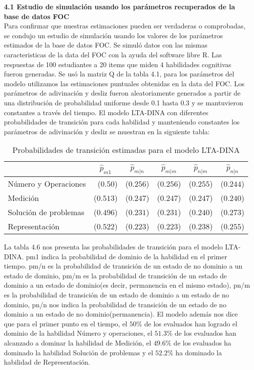 \noindent
\textbf{4.1 Estudio de simulación usando los parámetros recuperados de la base de datos FOC}\\
Para confirmar que nuestras estimaciones pueden ser verdaderas o comprobadas, se condujo un estudio de simulación usando los valores de los parámetros estimados de la base de datos FOC. Se simuló datos con las mismas caracteristicas de la data del FOC con la ayuda del software libre R. Las respuestas de 100 estudiantes a 20 items que miden 4 habilidades cognitivas fueron generadas. Se usó la matriz Q de la tabla 4.1, para los parámetros del modelo utilizamos las estimaciones puntuales obtenidas en la data del FOC. Los parámetros de adivinación y desliz fueron aleatoriamente generados a partir de una distribución de probabilidad uniforme desde 0.1 hasta 0.3 y se mantuvieron constantes a través del tiempo.
El modelo LTA-DINA con diferentes probabilidades de transición para cada habilidad y manteniendo constantes los parámetros de adivinación y desliz se muestran en la siguiente tabla:

\begin{table}[H]
	\centering
	\caption{Probabilidades de transición estimadas para el modelo LTA-DINA}
	\begin{tabular}{lrrrrr}
		\hline
		& \multicolumn{1}{c}{$\widehat{p}_{m1}$} & 				\multicolumn{1}{c}{$\widehat{p}_{m|n}$} & 					\multicolumn{1}{c}{$\widehat{p}_{m|m}$} & 
	\multicolumn{1}{c}{$\widehat{p}_{n|m}$} &
	\multicolumn{1}{c}{$\widehat{p}_{n|n}$}\\
		\hline
		Número y Operaciones	 	& ($0.50$) & ($0.256$) &  ($0.256$) &  ($0.255$) & ($0.244$)\\
		Medición			&  ($0.513$) &  ($0.247$) & ($0.247$) & ($0.247$) &  ($ 0.240$)\\
		Solución de problemas		&  ($ 0.496$) &  ($0.231$) &  ($0.231$) &  ($0.240$) & ($0.273$)\\
		Representación		&  ($0.522$) &  ($0.223$) &  ($0.223$) &  ($0.238$) &   ($0.255$)\\
		\hline
	\end{tabular}
\end{table}


\noindent
La tabla 4.6 nos presenta las probabilidades de transición para el modelo LTA-DINA. pm1 indica la probabilidad de dominio de la habilidad en el primer tiempo. pm/n es la probabilidad de transición de un estado de no dominio a un estado de dominio, pm/m es la probabilidad de transición de un estado de dominio a un estado de dominio(es decir, permanencia en el mismo estado), pn/m es la probabilidad de transición de un estado de dominio a un estado de no dominio, pn/n nos indica la probabilidad de transición de un estado de no dominio a un estado de no dominio(permanencia). El modelo además nos dice que para el primer punto en el tiempo, el $50\%$ de los evaluados han logrado el dominio de la habilidad Número y operaciones, el $51.3\%$ de los evaluados han alcanzado a dominar la habilidad de Medición, el $49.6\%$ de los evaluados ha dominado la habilidad Solución de problemas y el $52.2\%$ ha dominado la habilidad de Representación.      

